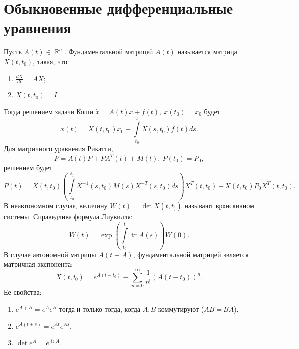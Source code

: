 \documentclass[a4paper,12pt]{scrartcl}
\DeclareMathOperator{\bbr}{\mathbb{R}}
\DeclareMathOperator{\tr}{tr}
\begin{document}
\section{Обыкновенные дифференциальные уравнения}
Пусть $A(t)\in\bbr^n$. Фундаментальной матрицей $A(t)$ называется матрица $X(t,t_0)$, такая, что
\begin{enumerate}
 \item $\frac{dX}{dt} = AX$;
 \item $X(t, t_0) = I$.
\end{enumerate}
Тогда решением задачи Коши $\dot{x} = A(t)x + f(t),\ x(t_0) = x_0$ будет
$$
x (t) = X(t,t_0)x_0 + \int\limits_{t_0}^t X(s,t_0)f(t)ds.
$$
Для матричного уравнения Рикатти,
$$
\dot{P} = A(t)P + PA^T(t) + M(t),\ P(t_0) = P_0,
$$
решением будет
$$
P(t) = X(t,t_0)\left(\int\limits_{t_0}^{t_1}X^{-1}(s,t_0)M(s)X^{-T}(s,t_0)ds \right)X^T(t,t_0) + X(t,t_0)P_0X^T(t,t_0).
$$
В неавтономном случае, величину $W(t) = \det X(t,t_))$ называют вронскианом системы. Справедлива формула Лиувилля:
$$
W(t) = \exp\left(\int\limits_{t_0}^t\tr A(s)\right)W(0). 
$$
В случае автономной матрицы $A(t\equiv A)$, фундаментальной матрицей является матричная экспонента:
$$
X(t,t_0) = e^{A(t-t_0)} \equiv \sum\limits_{n=0}^{\infty}\dfrac{1}{n!}(A(t-t_0))^n.
$$
Ее свойства:
\begin{enumerate}
 \item $e^{A+B} = e^{A}e^B$ тогда и только тогда, когда $A,B$ коммутируют ($AB=BA$).
 \item $e^{A(t+s)}=e^{At}e^{As}$.
 \item $\det e^A = e^{\tr A}$.
\end{enumerate}
\end{document}
